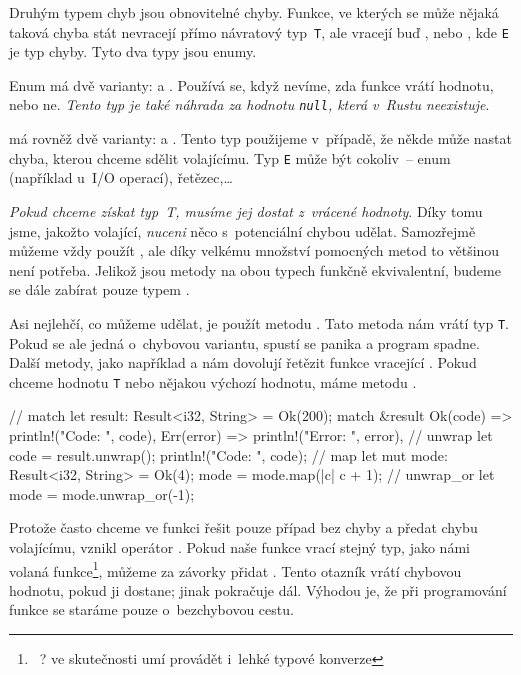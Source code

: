 \documentclass[main.tex]{subfiles}
\begin{document}

Druhým typem chyb jsou obnovitelné chyby. Funkce, ve kterých se může nějaká taková chyba
stát nevracejí přímo návratový typ~\texttt{T}, ale vracejí buď , nebo
, kde \texttt{E} je typ chyby. Tyto dva typy jsou enumy.
\cite[sekce\,9.2]{thebook}

Enum  má dvě varianty:  a . Používá se, když
nevíme, zda funkce vrátí hodnotu, nebo ne. \emph{Tento typ je také náhrada za hodnotu
    \texttt{null}, která v~Rustu neexistuje}.

 má rovněž dvě varianty:  a . Tento typ
použijeme v~případě, že někde může nastat chyba, kterou chceme sdělit volajícímu. Typ
\texttt{E} může být cokoliv~-- enum (například u~I/O operací), řetězec,\dots


\emph{Pokud chceme získat typ~T, musíme jej dostat z~vrácené hodnoty}. Díky tomu jsme,
jakožto volající, \emph{nuceni} něco s~potenciální chybou udělat. Samozřejmě můžeme vždy použít , ale díky velkému množství pomocných metod to většinou není potřeba.
Jelikož jsou metody na obou typech funkčně ekvivalentní, budeme se dále zabírat pouze
typem .

Asi nejlehčí, co můžeme udělat, je použít metodu . Tato metoda nám vrátí typ
\texttt{T}. Pokud se ale jedná o~chybovou variantu, spustí se panika a program spadne.
Další metody, jako například  a  nám dovolují řetězit funkce
vracející . Pokud chceme hodnotu \texttt{T} nebo nějakou výchozí hodnotu,
máme metodu . \cite[result]{ruststd}

\obrazek
\begin{rustcode}
    // match
    let result: Result<i32, String> = Ok(200);
    match &result {
        Ok(code) => println!("Code: {}", code),
        Err(error) => println!("Error: {}", error),
    }
    // unwrap
    let code = result.unwrap();
    println!("Code: {}", code);
    // map
    let mut mode: Result<i32, String> = Ok(4);
    mode = mode.map(|c| c + 1);
    // unwrap\_or
    let mode = mode.unwrap_or(-1);
\end{rustcode}


Protože často chceme ve funkci řešit pouze případ bez chyby a předat chybu volajícímu,
vznikl operátor . Pokud naše funkce vrací stejný typ, jako námi volaná
funkce\footnote{~? ve skutečnosti umí provádět i~lehké typové konverze}, můžeme za
závorky přidat . Tento otazník vrátí chybovou hodnotu, pokud ji dostane; jinak
pokračuje dál. Výhodou je, že při programování funkce se staráme pouze o~bezchybovou
cestu. \cite[sekce\,9.2]{thebook}
\end{document}
